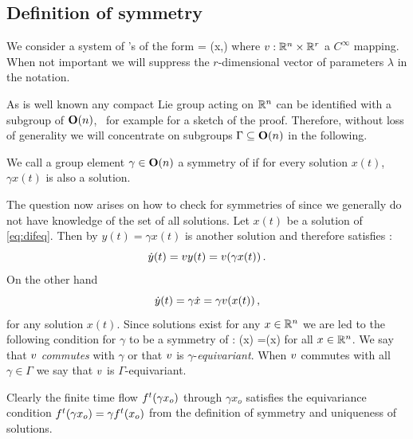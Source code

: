 \renewcommand{\inputfile}{\version\ - edited 2007-03-11 symODEs}

\subsection{Definition of symmetry}

We consider a system of \ode's of the form
\beq
	 = \vf(x,\lambda)
	\label{eq:difeq}
\eeq
where $v: \mathbb{R}^{n}\times\mathbb{R}^{r}$ a $C^\infty$ mapping. When
not important we will suppress the $r$-dimensional vector of parameters
$\lambda$ in the notation.

As is well known any compact Lie group acting on $\mathbb{R}^{n}$ can be identified
with a subgroup of $\mathbf{O}(n)$, \cf\ for example 
for a sketch of the proof. Therefore, without loss of generality
we will concentrate on subgroups $\Gamma\subseteq\mathbf{O}(n)$ in the following.

\begin{definition}
\label{def:symmetry}
We call a group element $\gamma\in\mathbf{O}(n)$ a symmetry of  if for every solution
$x(t)$, $\gamma x(t)$ is also a solution.
\end{definition}

The question now arises on how to check for symmetries of  since
we generally do not have knowledge of the set of all solutions. Let $x(t)$ be a solution
of \ref{eq:difeq}. Then by  $y(t)=\gamma x(t)$ is another solution 
and therefore satisfies :
\[
 \dot{y}(t)=v{y(t)}=v(\gamma x(t))\,.
\]
On the other hand
\[
 \dot{y}(t)=\gamma \dot{x} = \gamma v(x(t))\,,
\]
for any solution $x(t)$. Since solutions exist for any $x\in\mathbb{R}^{n}$ we are led to the following 
condition for $\gamma$ to be a symmetry of :
\beq
	\vf(\gamma x) =\gamma \vf(x)
	\label{eq:equiv}
\eeq
for all $x\in\mathbb{R}^{n}$. We say that $v$ \emph{commutes} with $\gamma$ or that $v$ is $\gamma$-\emph{equivariant}.
When $v$ commutes with all $\gamma\in\Gamma$ we say that $v$ is $\Gamma$-equivariant.

Clearly the finite time flow ${f^{t}(\gamma x_o)}$ through $\gamma x_o$ 
satisfies the equivariance condition ${f^{t}(\gamma x_o)}=\gamma {f^{t}(x_o)}$ from 
the definition of symmetry and uniqueness of solutions.


